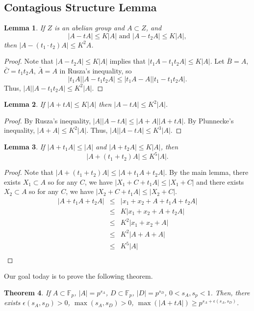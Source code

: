 \documentclass[12pt]{amsart}
\newtheorem{theorem}{Theorem}[section]
\newtheorem{lemma}[theorem]{Lemma}
\newcommand{\F}{\mathbb{F}}
\begin{document}
\subsection{Contagious Structure Lemma}
\begin{lemma}
    If $Z$ is an abelian group and $A \subset Z$, and  
    $$|A-tA|\leq K|A| \text{ and }|A-t_2A|\leq K|A|,$$
    then $|A-(t_1\cdot t_2 )A|\leq K^2A$. 
\end{lemma}
\begin{proof}
    Note that $|A-t_2A|\leq K|A|$ implies that $|t_1A-t_1t_2A|\leq K|A|$. Let $\bar{B}=A$, $\bar{C}=t_1t_2A$, $\bar{A}=A$ in Rusza's inequality, so 
    $$|t_1A||A-t_1t_2A|\leq |t_1A-A||t_1-t_1t_2A|.$$
    Thus, $|A||A-t_1t_2A|\leq K^2|A|$.
\end{proof}
\begin{lemma}
    If $|A+tA|\leq K|A|$ then $|A-tA| \leq K^2|A|$.
\end{lemma}
\begin{proof}
    By Rusza's inequality, $|A||A-tA|\leq |A+A||A+tA|$. By Plunnecke's inequality, $|A+A|\leq K^2|A|$. Thus, $|A||A-tA|\leq K^3|A|$. 
\end{proof}
\begin{lemma}
    If $|A+t_1A| \leq |A|$ and $|A+t_2A| \leq K|A|$, then 
    $$|A+(t_1+t_2)A|\leq K^5|A|. $$
\end{lemma}
\begin{proof}
   Note that  $|A+(t_1+t_2)A| \leq |A+t_1A+t_2A|$. By the main lemma, there exists $X_1\subset A$ so for any $C$, we have $|X_1+C+t_1A|\leq |X_1+C|$ and there exists $X_2\subset A$ so for any $C$, we have $|X_2+C+t_1A|\leq |X_2+C|$. 
   \begin{eqnarray*}
       |A+t_1A+t_2A| & \leq & |x_1+x_2+A+t_1A+t_2A|\\
       &\leq& K|x_1+x_2+A+t_2A|\\
       &\leq& K^2|x_1+x_2+A|\\
       &\leq& K^2|A+A+A|\\
    &\leq& K^5|A|\\
   \end{eqnarray*}
\end{proof}
Our goal today is to prove the following theorem. 
\begin{theorem}\label{mainthm}
    If $A\subset \F_p$, $|A|=p^{s_A}$, $D\subset \F_p$, $|D|=p^{s_D}$, $0 <s_A,s_p<1$. Then, there exists $\epsilon(s_A,s_D)>0$, $\max(s_A,s_D)>0$, $\max(|A+tA|)\geq p^{s_A+\epsilon(s_A,s_D)}$.  
\end{theorem}
\end{document}
